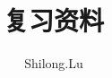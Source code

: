 \documentclass[zihao=-4,fontset=ubuntu,twoside]{ctexbook}
\makeatletter
\newcommand*\bookseries[1]{\def\@bookseries{#1}}
\newcommand*\subtitle[1]{\def\@subtitle{#1}}
\newcommand*\edition[1]{\def\@edition{#1}}
\newcommand*\presslogo[1]{\def\@presslogo{#1}}
\newcommand*\pressname[1]{\def\@pressname{#1}}
\makeatother
\begin{document}
\thispagestyle{empty}
\title{复习资料}
\subtitle{微分几何}
\edition{第一版}
\bookseries{期末复习}
\author{Shilong.Lu}
\pressname{Springer} %
\presslogo{figures/Springer-logo.png} %
\makecover
\thispagestyle{empty}

\end{document}
